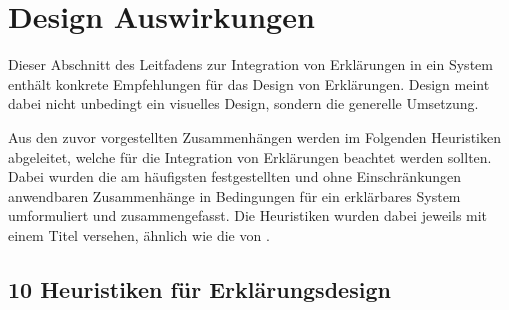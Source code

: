 \section{Design Auswirkungen}
\label{sec:model_design_implications}

Dieser Abschnitt des Leitfadens zur Integration von Erklärungen in ein System enthält konkrete Empfehlungen für das Design von Erklärungen. Design meint dabei nicht unbedingt ein visuelles Design, sondern die generelle Umsetzung.

Aus den zuvor vorgestellten Zusammenhängen werden im Folgenden Heuristiken abgeleitet, welche für die Integration von Erklärungen beachtet werden sollten. Dabei wurden die am häufigsten festgestellten und ohne Einschränkungen anwendbaren Zusammenhänge in Bedingungen für ein erklärbares System umformuliert und zusammengefasst. Die Heuristiken wurden dabei jeweils mit einem Titel versehen, ähnlich wie die  von \citeauthor{nielsen10usability} \cite{nielsen10usability}.

\subsection*{10 Heuristiken für Erklärungsdesign}

